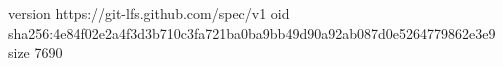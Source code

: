 version https://git-lfs.github.com/spec/v1
oid sha256:4e84f02e2a4f3d3b710c3fa721ba0ba9bb49d90a92ab087d0e5264779862e3e9
size 7690

